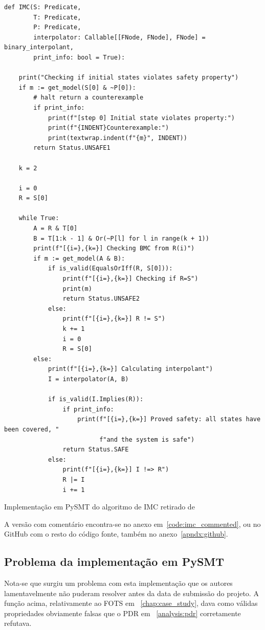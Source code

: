 \documentclass[11pt,a4paper]{report}%
\newenvironment{code}{\captionsetup{type=listing}}{}
\begin{document}
\begin{code}
\begin{verbatim}
def IMC(S: Predicate,
        T: Predicate,
        P: Predicate,
        interpolator: Callable[[FNode, FNode], FNode] = binary_interpolant,
        print_info: bool = True):

    print("Checking if initial states violates safety property")
    if m := get_model(S[0] & ~P[0]):
        # halt return a counterexample
        if print_info:
            print(f"[step 0] Initial state violates property:")
            print(f"{INDENT}Counterexample:")
            print(textwrap.indent(f"{m}", INDENT))
        return Status.UNSAFE1

    k = 2

    i = 0
    R = S[0]

    while True:
        A = R & T[0]
        B = T[1:k - 1] & Or(~P[l] for l in range(k + 1))
        print(f"[{i=},{k=}] Checking BMC from R(i)")
        if m := get_model(A & B):
            if is_valid(EqualsOrIff(R, S[0])):
                print(f"[{i=},{k=}] Checking if R=S")
                print(m)
                return Status.UNSAFE2
            else:
                print(f"[{i=},{k=}] R != S")
                k += 1
                i = 0
                R = S[0]
        else:
            print(f"[{i=},{k=}] Calculating interpolant")
            I = interpolator(A, B)

            if is_valid(I.Implies(R)):
                if print_info:
                    print(f"[{i=},{k=}] Proved safety: all states have been covered, "
                          f"and the system is safe")
                return Status.SAFE
            else:
                print(f"[{i=},{k=}] I !=> R")
                R |= I
                i += 1
\end{verbatim}
\caption{Implementação em PySMT do algoritmo de IMC retirado de \cite{interpolation_thesis}}
\label{code:imc}
\end{code}

A versão com comentário encontra-se no anexo em~\ref{code:imc_commented}, ou no GitHub com
o resto do código fonte, também no anexo~\ref{apndx:github}.

\subsection{Problema da implementação em PySMT}
\label{imc:problem}

Nota-se que surgiu um problema com esta implementação que os autores lamentavelmente
não puderam resolver antes da data de submissão do projeto.
A função acima, relativamente ao FOTS em ~\ref{chap:case_study}, dava como válidas
propriedades obviamente falsas que o PDR em ~\ref{analysis:pdr} corretamente refutava.
\end{document}
